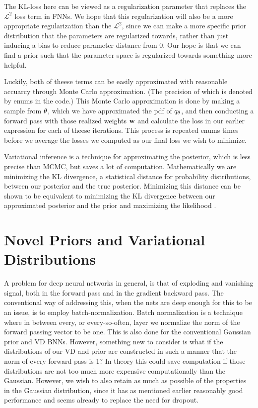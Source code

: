 \documentclass[nofootinbib,UKenglish,nobalancelastpage,12pt]{article}
\newcommand{\vect}{\ensuremath{\mathbf}}
\begin{document}
The KL-loss here can be viewed as a regularization parameter that replaces the $\mathcal{L}^2$ loss term in FNNs. We hope that this regularization will also be a more appropriate regularization than the $\mathcal{L}^2$, since we can make a more specific prior distribution that the parameters are regularized towards, rather than just inducing a bias to reduce parameter distance from 0. Our hope is that we can find a prior such that the parameter space is regularized towards something more helpful.

Luckily, both of theese terms can be easily approximated with reasonable accuarcy through Monte Carlo approximation. (The precision of which is denoted by enums in the code.) This Monte Carlo approximation is done by making a sample from $\vect{\theta}$, which we have approximated the pdf of $q_{\vect{\theta}}$, and then conducting a forward pass with those realized weights $\vect{w}$ and calculate the loss in our earlier expression for each of theese iterations. This process is repeated enums times before we average the losses we computed as our final loss we wish to minimize.


Variational inference is a technique for approximating the posterior, which is less precise than MCMC, but saves a lot of computation. Mathematically we are minimizing the KL divergence, a statistical distance for probability distributions, between our posterior and the true posterior. Minimizing this distance can be shown to be equivalent to minimizing the KL divergence between our approximated posterior and the prior and maximizing the likelihood \cite{VI_paper}. 

\section{Novel Priors and Variational Distributions}

A problem for deep neural networks in general, is that of exploding and vanishing signal, both in the forward pass and in the gradient backward pass. The conventional way of addressing this, when the nets are deep enough for this to be an issue, is to employ batch-normalization. Batch normalization\cite{Batch_Norm_original} is a technique where in between every, or every-so-often, layer we normalize the norm of the forward passing vector to be one. This is also done for the conventional Gaussian prior and VD BNNs. However, something new to consider is what if the distributions of our VD and prior are constructed in such a manner that the norm of every forward pass is 1? In theory this could save computation if those distributions are not too much more expensive computationally than the Gaussian. However, we wish to also retain as much as possible of the properties in the Gaussian distribution, since it has as mentioned earlier reasonably good performance and seems already to replace the need for dropout. 
\end{document}

